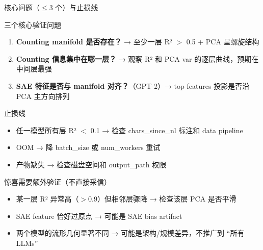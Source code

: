 \begin{frame}{核心问题（$\le$3 个）与止损线}
\small
\begin{block}{三个核心验证问题}
\begin{enumerate}
  \item \textbf{Counting manifold 是否存在？} → 至少一层 R² $>$ 0.5 + PCA 呈螺旋结构
  \item \textbf{Counting 信息集中在哪一层？} → 观察 R² 和 PCA var 的逐层曲线，预期在中间层最强
  \item \textbf{SAE 特征是否与 manifold 对齐？}（GPT-2）→ top features 投影是否沿 PCA 主方向排列
\end{enumerate}
\end{block}

\begin{alertblock}{止损线}
\begin{itemize}
  \item 任一模型所有层 R² $<$ 0.1 → 检查 chars\_since\_nl 标注和 data pipeline
  \item OOM → 降 batch\_size 或 num\_workers 重试
  \item 产物缺失 → 检查磁盘空间和 output\_path 权限
\end{itemize}
\end{alertblock}

\begin{block}{惊喜需要额外验证（不直接采信）}
\begin{itemize}
  \item 某一层 R² 异常高（$>$0.9）但相邻层骤降 → 检查该层 PCA 是否平滑
  \item SAE feature 恰好过原点 → 可能是 SAE bias artifact
  \item 两个模型的流形几何显著不同 → 可能是架构/规模差异，不推广到 ``所有 LLMs''
\end{itemize}
\end{block}
\end{frame}

